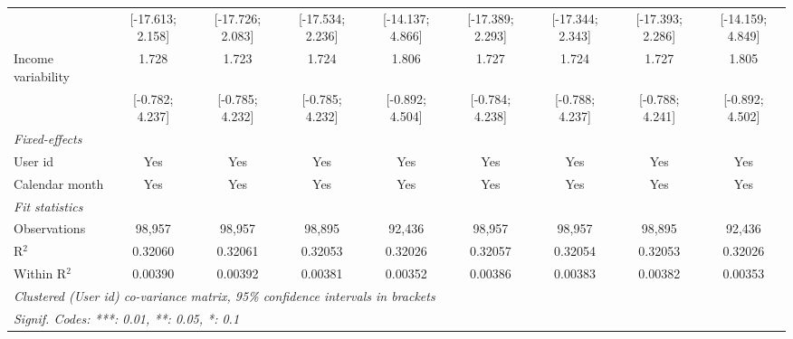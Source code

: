 \begin{table}[htbp]
\begin{threeparttable}[b]
\begin{tabular}{lcccccccc}
                                          & [-17.613; 2.158] & [-17.726; 2.083] & [-17.534; 2.236] & [-14.137; 4.866] & [-17.389; 2.293] & [-17.344; 2.343] & [-17.393; 2.286] & [-14.159; 4.849]\\   
         Income variability               & 1.728            & 1.723            & 1.724            & 1.806            & 1.727            & 1.724            & 1.727            & 1.805\\   
                                          & [-0.782; 4.237]  & [-0.785; 4.232]  & [-0.785; 4.232]  & [-0.892; 4.504]  & [-0.784; 4.238]  & [-0.788; 4.237]  & [-0.788; 4.241]  & [-0.892; 4.502]\\   
         \midrule
         \emph{Fixed-effects}\\
         User id                          & Yes              & Yes              & Yes              & Yes              & Yes              & Yes              & Yes              & Yes\\  
         Calendar month                   & Yes              & Yes              & Yes              & Yes              & Yes              & Yes              & Yes              & Yes\\  
         \midrule
         \emph{Fit statistics}\\
         Observations                     & 98,957           & 98,957           & 98,895           & 92,436           & 98,957           & 98,957           & 98,895           & 92,436\\  
         R$^2$                            & 0.32060          & 0.32061          & 0.32053          & 0.32026          & 0.32057          & 0.32054          & 0.32053          & 0.32026\\  
         Within R$^2$                     & 0.00390          & 0.00392          & 0.00381          & 0.00352          & 0.00386          & 0.00383          & 0.00382          & 0.00353\\  
         \midrule \midrule
         \multicolumn{9}{l}{\emph{Clustered (User id) co-variance matrix, 95\% confidence intervals in brackets}}\\
         \multicolumn{9}{l}{\emph{Signif. Codes: ***: 0.01, **: 0.05, *: 0.1}}\\
      \end{tabular}
   \end{threeparttable}
\end{table}


